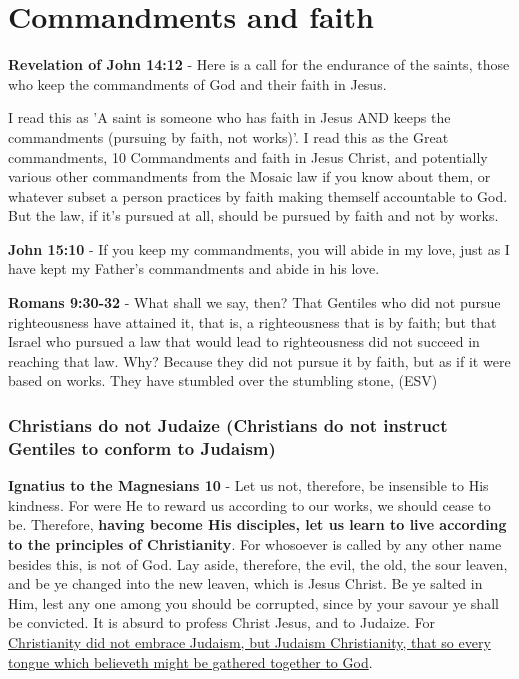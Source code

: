 \documentclass[11pt]{article}
\begin{document}
\section{Commandments and faith}
\label{sec:orgda22b49}
\textbf{Revelation of John 14:12} - Here is a call for the endurance of the saints, those who keep the commandments of God and their faith in Jesus.

I read this as 'A saint is someone who has faith in Jesus AND keeps the commandments (pursuing by faith, not works)'.
I read this as the Great commandments, 10 Commandments and faith in Jesus Christ, and potentially various other commandments from the Mosaic law if you know about them, or whatever subset a person practices by faith making themself accountable to God.
But the law, if it's pursued at all, should be pursued by faith and not by works.

\textbf{John 15:10} - If you keep my commandments, you will abide in my love, just as I have kept my Father's commandments and abide in his love.

\textbf{Romans 9:30-32} - What shall we say, then? That Gentiles who did not pursue righteousness have attained it, that is, a righteousness that is by faith; but that Israel who pursued a law that would lead to righteousness did not succeed in reaching that law. Why? Because they did not pursue it by faith, but as if it were based on works. They have stumbled over the stumbling stone, (ESV)

\subsubsection{Christians do not Judaize (Christians do not instruct Gentiles to conform to Judaism)}
\label{sec:orgec1b3e2}
\textbf{Ignatius to the Magnesians 10} - Let us not, therefore, be insensible to His kindness. For were He to reward us according to our works, we should cease to be. Therefore, \textbf{having become His disciples, let us learn to live according to the principles of Christianity}. For whosoever is called by any other name besides this, is not of God. Lay aside, therefore, the evil, the old, the sour leaven, and be ye changed into the new leaven, which is Jesus Christ. Be ye salted in Him, lest any one among you should be corrupted, since by your savour ye shall be convicted. It is absurd to profess Christ Jesus, and to Judaize. For \uline{Christianity did not embrace Judaism, but Judaism Christianity, that so every tongue which believeth might be gathered together to God}.
\end{document}
